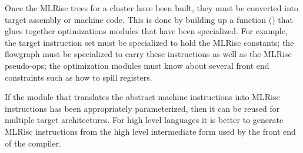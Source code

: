 \begin{enumerate}
   Once the MLRisc trees for a cluster have been built, they must
  be converted into target assembly or machine code. This is done by
  building up a function () that
  glues together optimizations modules that have been specialized. For
  example, the target instruction set must be specialized to hold the
  MLRisc constants; the flowgraph must be specialized to carry these
  instructions as well as the MLRisc pseudo-ops; the optimization
  modules must know about several front end constraints such as how to
  spill registers.
  \end{enumerate}

   If the module that translates the abstract machine instructions
  into MLRisc instructions has been appropriately parameterized, then
  it can be reused for multiple target architectures. For high level
  languages it is better to generate MLRisc instructions from the high
  level intermediate form used by the front end of the compiler.
